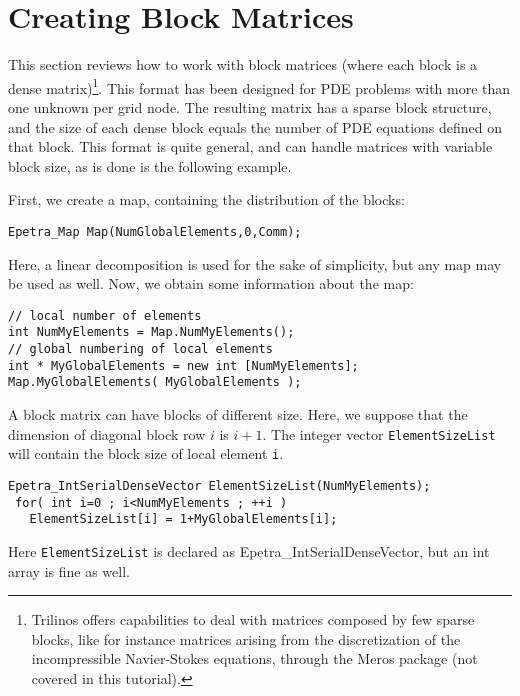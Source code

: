 \section{Creating Block Matrices}
\label{sec:sparse_vbr}

This section reviews how to work with block matrices (where each block
is a dense matrix)\footnote{Trilinos offers capabilities to deal with
  matrices composed by few sparse blocks, like for instance matrices
  arising from the discretization of the incompressible Navier-Stokes
  equations, through the Meros package (not covered in this tutorial).}.
This format has been designed for PDE problems with more than one
unknown per grid node.  The resulting matrix has a sparse block
structure, and the size of each dense block equals the number of PDE
equations defined on that block.  This format is quite general, and can
handle matrices with variable block size, as is done is the following
example.

First, we create a map, containing the distribution of the blocks:
\begin{verbatim}
Epetra_Map Map(NumGlobalElements,0,Comm);
\end{verbatim}
Here, a linear decomposition is used for the sake of simplicity, but any
map may be used as well.
Now, we obtain some information about the map:
\begin{verbatim}
// local number of elements
int NumMyElements = Map.NumMyElements();
// global numbering of local elements
int * MyGlobalElements = new int [NumMyElements];
Map.MyGlobalElements( MyGlobalElements );
\end{verbatim}
A block matrix can have blocks of different size.  Here, we suppose that
the dimension of diagonal block row $i$ is $i+1$.  The integer vector
\verb!ElementSizeList! will contain the block size of local element
\verb!i!.
\begin{verbatim}
Epetra_IntSerialDenseVector ElementSizeList(NumMyElements);
 for( int i=0 ; i<NumMyElements ; ++i ) 
   ElementSizeList[i] = 1+MyGlobalElements[i];
\end{verbatim}
Here \verb!ElementSizeList! is declared as Epetra\_IntSerialDenseVector,
but an int array is fine as well.

